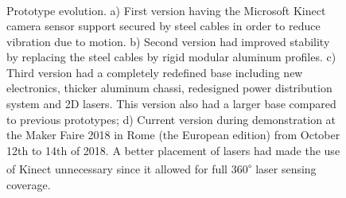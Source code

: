 \begin{figure}[ht]
      \centering
      \begin{subfigure}[b]{0.22\textwidth}
      	\centering
	  	\caption{}
	  	\label{fig:evolution_a}
      \end{subfigure}
	 ~
	  \begin{subfigure}[b]{0.22\textwidth}
		\centering
	  	\caption{}\label{robot}
      \end{subfigure}
      ~
      \begin{subfigure}[b]{0.22\textwidth}
      	\centering
      	\caption{}
      \end{subfigure}
      ~
      \begin{subfigure}[b]{0.22\textwidth}
	      \centering
	      \caption{}
      \end{subfigure}
      \caption{Prototype evolution. a) First version having the Microsoft Kinect\textsuperscript{\textregistered} camera sensor support secured by steel cables in order to reduce vibration due to motion. b) Second version had improved stability by replacing the steel cables by rigid modular aluminum profiles. c) Third version had a completely redefined base including new electronics, thicker aluminum chassi, redesigned power distribution system and 2D lasers. This version also had a larger base compared to previous prototypes; d) Current version during demonstration at the Maker Faire 2018 in Rome (the European edition) from October 12th to 14th of 2018. A better placement of lasers had made the use of Kinect\textsuperscript{\textregistered} unnecessary since it allowed for full 360\textsuperscript{$\circ$} laser sensing coverage.}

\end{figure}
